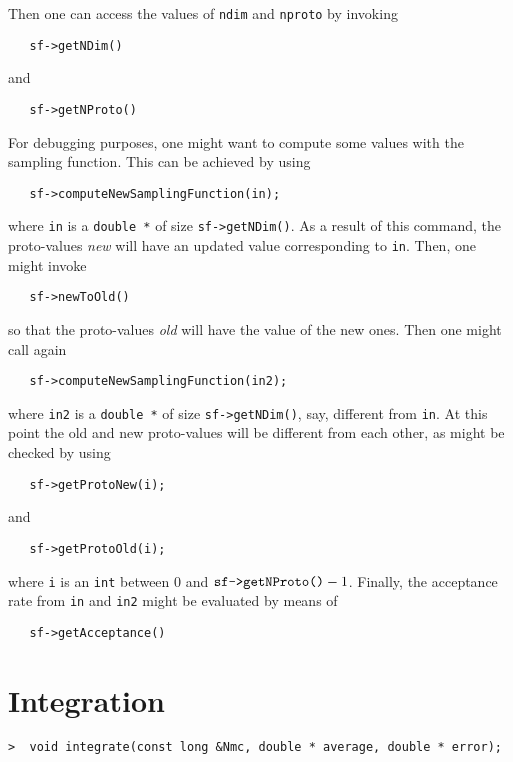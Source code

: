 \documentclass[11pt,a4paper,twoside]{article}
\begin{document}
Then one can access the values of \verb+ndim+ and \verb+nproto+ by invoking
\begin{verbatim}
   sf->getNDim()
\end{verbatim}
and
\begin{verbatim}
   sf->getNProto()
\end{verbatim}

For debugging purposes, one might want to compute some values with the sampling function.
This can be achieved by using
\begin{verbatim}
   sf->computeNewSamplingFunction(in);
\end{verbatim}
where \verb+in+ is a \verb+double *+ of size \verb+sf->getNDim()+.
As a result of this command, the proto-values \emph{new} will have an updated value corresponding to \verb+in+.
Then, one might invoke
\begin{verbatim}
   sf->newToOld()
\end{verbatim}
so that the proto-values \emph{old} will have the value of the new ones.
Then one might call again
\begin{verbatim}
   sf->computeNewSamplingFunction(in2);
\end{verbatim}
where \verb+in2+ is a \verb+double *+ of size \verb+sf->getNDim()+, say, different from \verb+in+.
At this point the old and new proto-values will be different from each other, as might be checked by using
\begin{verbatim}
   sf->getProtoNew(i);
\end{verbatim}
and
\begin{verbatim}
   sf->getProtoOld(i);
\end{verbatim}
where \verb+i+ is an \verb+int+ between $0$ and $\verb+sf->getNProto()+ - 1$.
Finally, the acceptance rate from \verb+in+ and \verb+in2+ might be evaluated by means of
\begin{verbatim}
   sf->getAcceptance()
\end{verbatim}





\section{Integration} %
\label{sec:integration}

\begin{verbatim}
>  void integrate(const long &Nmc, double * average, double * error);
\end{verbatim}
\end{document}
